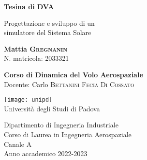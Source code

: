 \begin{titlepage}
    \setlength{\parskip}{0em}
    \begin{center}
        \vspace*{3.5cm}

        \LARGE
        \textbf{Tesina di DVA}

        \vspace{0.2cm}

        Progettazione e sviluppo di un\\simulatore del Sistema Solare

        \vspace{3cm}

        \textbf{Mattia \textsc{Gregnanin}}\\[0.2cm]
        \Large
        N. matricola: 2033321

        \vspace{3cm}
        \textbf{Corso di Dinamica del Volo Aerospaziale}\\
        Docente: Carlo \textsc{Bettanini Fecia Di Cossato}

        \large
        \vspace{1cm}
        \texttt{[image: unipd]}\\

        \vspace{0.5cm}
        Università degli Studi di Padova

        \vspace{0.2cm}
        Dipartimento di Ingegneria Industriale \\

        \vspace{0.2cm}
        Corso di Laurea in Ingegneria Aerospaziale \\

        \vspace{0.2cm}
        Canale A \\

        \vspace{0.2cm}
        Anno accademico 2022-2023
    \end{center}
\end{titlepage}